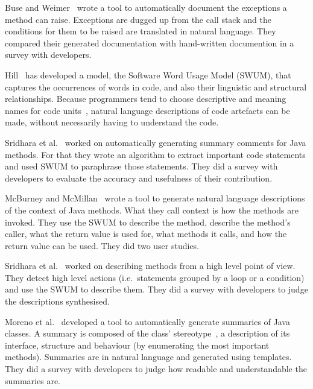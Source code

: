 \documentclass[11pt]{sdm_internship}
\theoremstyle{definition}
\begin{document}
Buse and Weimer~\cite{buse2008automatic} wrote a tool to automatically document the exceptions a method can raise.
Exceptions are dugged up from the call stack and the conditions for them to be raised are translated in natural language.
They compared their generated documentation with hand-written documention in a survey with developers.

Hill~\cite{hill2009automatically,hill2010integrating} has developed a model, the Software Word Usage Model (SWUM), that captures the occurrences of words in code, and also their linguistic and structural relationships.
Because programmers tend to choose descriptive and meaning names for code units~\cite{liblit2006cognitive}, natural language descriptions of code artefacts can be made, without necessarily having to understand the code.

Sridhara et al.~\cite{sridhara2010towards,sridhara2012automatic} worked on automatically generating summary comments for Java methods.
For that they wrote an algorithm to extract important code statements and used SWUM to paraphrase those statements.
They did a survey with developers to evaluate the accuracy and usefulness of their contribution.

McBurney and McMillan~\cite{mcburney2016automatic} wrote a tool to generate natural language descriptions of the context of Java methods.
What they call context is how the methods are invoked.
They use the SWUM to describe the method, describe the method's caller, what the return value is used for, what methods it calls, and how the return value can be used.
They did two user studies.

Sridhara et al.~\cite{sridhara2011automatically} worked on describing methods from a high level point of view.
They detect high level actions (i.e.\ statements grouped by a loop or a condition) and use the SWUM to describe them.
They did a survey with developers to judge the descriptions synthesised.

Moreno et al.~\cite{moreno2013automatic} developed a tool to automatically generate summaries of Java classes.
A summary is composed of the class' stereotype~\cite{moreno2012jstereocode}, a description of its interface, structure and behaviour (by enumerating the most important methods).
Summaries are in natural language and generated using templates.
They did a survey with developers to judge how readable and understandable the summaries are.
\end{document}

